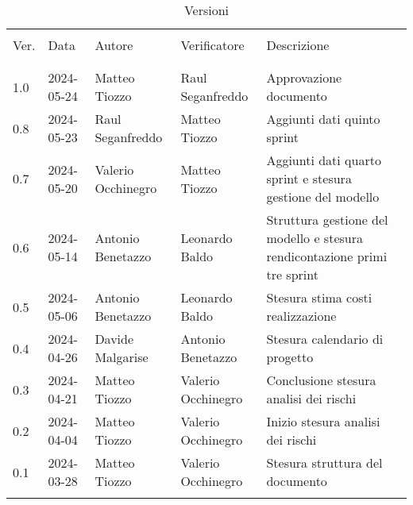 \documentclass[12pt]{article} %
\begin{document}


\newpage



\begin{table}[!h]
	\footnotesize
	\begin{center}
		\caption*{Versioni}
		\vspace{0.5cm}
		\begin{tabular}{ l l l l p{6cm} }
			\hline                                                                                          \\[-2ex]
			Ver. & Data & Autore & Verificatore & Descrizione \\
			\\[-2ex] \hline \\[-1.5ex]
			1.0 & 2024-05-24 & Matteo Tiozzo & Raul Seganfreddo & Approvazione documento\\
			0.8 & 2024-05-23 & Raul Seganfreddo & Matteo Tiozzo & Aggiunti dati quinto sprint\\
			0.7 & 2024-05-20 & Valerio Occhinegro & Matteo Tiozzo & Aggiunti dati quarto sprint e stesura gestione del modello \\
			0.6 & 2024-05-14 & Antonio Benetazzo & Leonardo Baldo  & Struttura gestione del modello e stesura rendicontazione primi tre sprint  \\
			0.5 & 2024-05-06 & Antonio Benetazzo & Leonardo Baldo & Stesura stima costi realizzazione \\
			0.4 & 2024-04-26 & Davide Malgarise & Antonio Benetazzo & Stesura calendario di progetto \\
			0.3 & 2024-04-21 & Matteo Tiozzo & Valerio Occhinegro & Conclusione stesura analisi dei rischi \\
			0.2 & 2024-04-04 & Matteo Tiozzo & Valerio Occhinegro & Inizio stesura analisi dei rischi \\
			0.1 & 2024-03-28 & Matteo Tiozzo & Valerio Occhinegro & Stesura struttura del documento \\
			\\[-1.5ex] \hline
		\end{tabular}
	\end{center}
\end{table}

\newpage

\tableofcontents

\newpage

\listoftables

\listoffigures

\newpage



\newpage



\newpage



\newpage



\newpage


\end{document}
